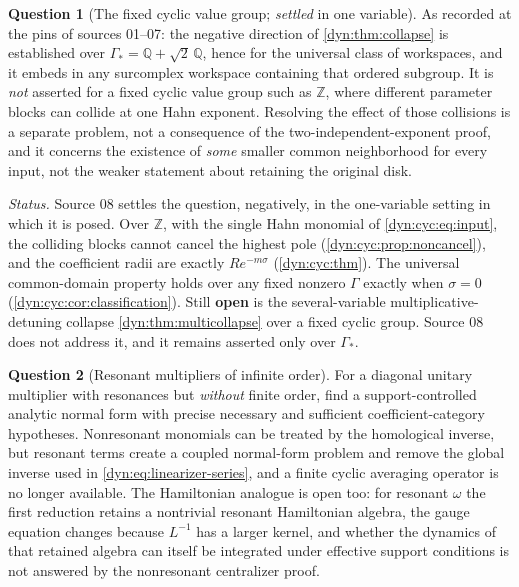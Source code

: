 \documentclass[11pt,letterpaper]{article}
\theoremstyle{definition}
\newtheorem{question}[question]{Question}
\theoremstyle{remark}
\newcommand{\Q}{\mathbb Q}
\newcommand{\Z}{\mathbb Z}
\numberwithin{equation}{section}
\begin{document}
\begin{question}[The fixed cyclic value group; \emph{settled} in one
variable]\label{dyn:q:cyclic}
As recorded at the pins of sources 01--07: the negative direction of
\cref{dyn:thm:collapse} is established over
$\Gamma_{*}=\Q+\sqrt2\,\Q$, hence for the universal class of workspaces,
and it embeds in any surcomplex workspace containing that ordered subgroup.
It is \emph{not} asserted for a fixed cyclic value group such as $\Z$,
where different parameter blocks can collide at one Hahn exponent.
Resolving the effect of those collisions is a separate problem, not a
consequence of the two-independent-exponent proof, and it concerns the
existence of \emph{some} smaller common neighborhood for every input, not
the weaker statement about retaining the original disk.

\emph{Status.} Source 08 settles the question, negatively, in the
one-variable setting in which it is posed. Over $\Z$, with the single Hahn
monomial of \eqref{dyn:cyc:eq:input}, the colliding blocks cannot cancel the
highest pole (\cref{dyn:cyc:prop:noncancel}), and the coefficient radii are
exactly $Re^{-m\sigma}$ (\cref{dyn:cyc:thm}). The universal common-domain
property holds over any fixed nonzero $\Gamma$ exactly when $\sigma=0$
(\cref{dyn:cyc:cor:classification}). Still \textbf{open} is the
several-variable multiplicative-detuning collapse \cref{dyn:thm:multicollapse}
over a fixed cyclic group. Source 08 does not address it, and it remains
asserted only over $\Gamma_{*}$.
\end{question}

\begin{question}[Resonant multipliers of infinite order]\label{dyn:q:resonant}
For a diagonal unitary multiplier with resonances but \emph{without} finite
order, find a support-controlled analytic normal form with precise
necessary and sufficient coefficient-category hypotheses. Nonresonant
monomials can be treated by the homological inverse, but resonant terms
create a coupled normal-form problem and remove the global inverse used in
\eqref{dyn:eq:linearizer-series}, and a finite cyclic averaging operator is
no longer available. The Hamiltonian analogue is open too: for resonant
$\omega$ the first reduction retains a nontrivial resonant Hamiltonian
algebra, the gauge equation changes because $L^{-1}$ has a larger kernel,
and whether the dynamics of that retained algebra can itself be integrated
under effective support conditions is not answered by the nonresonant
centralizer proof.
\end{question}
\end{document}
